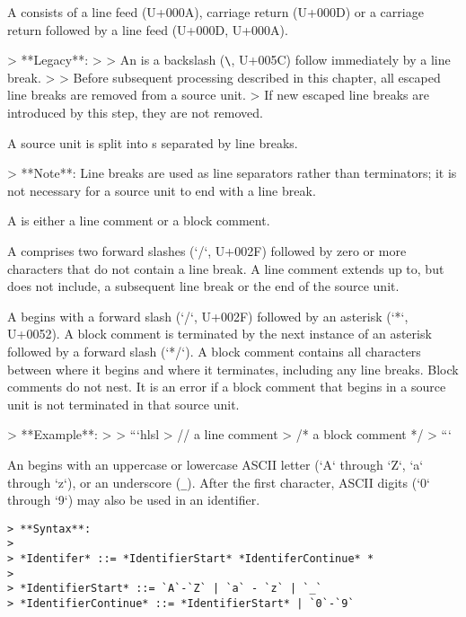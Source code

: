 
A  consists of a line feed (U+000A), carriage return (U+000D) or a carriage return followed by a line feed (U+000D, U+000A).

> **Legacy**:
>
> An  is a backslash (\lstinline{\}, U+005C) follow immediately by a line break.
>
> Before subsequent processing described in this chapter, all escaped line breaks are removed from a source unit.
> If new escaped line breaks are introduced by this step, they are not removed.

A source unit is split into s separated by line breaks.

> **Note**: Line breaks are used as line separators rather than terminators; it is not necessary for a source unit to end with a line break.


A  is either a line comment or a block comment.

A  comprises two forward slashes (`/`, U+002F) followed by zero or more characters that do not contain a line break.
A line comment extends up to, but does not include, a subsequent line break or the end of the source unit.

A  begins with a forward slash (`/`, U+002F) followed by an asterisk (`*`, U+0052). 
A block comment is terminated by the next instance of an asterisk followed by a forward slash (`*/`).
A block comment contains all characters between where it begins and where it terminates, including any line breaks.
Block comments do not nest.
It is an error if a block comment that begins in a source unit is not terminated in that source unit.

> **Example**:
>
> ```hlsl
> // a line comment
> /* a block comment */
> ```


An  begins with an uppercase or lowercase ASCII letter (`A` through `Z`, `a` through `z`), or an underscore (\lstinline{_}).
After the first character, ASCII digits (`0` through `9`) may also be used in an identifier.

\begin{verbatim}
> **Syntax**:
>
> *Identifer* ::= *IdentifierStart* *IdentiferContinue* *
>
> *IdentifierStart* ::= `A`-`Z` | `a` - `z` | `_`
> *IdentifierContinue* ::= *IdentifierStart* | `0`-`9`        
\end{verbatim}


